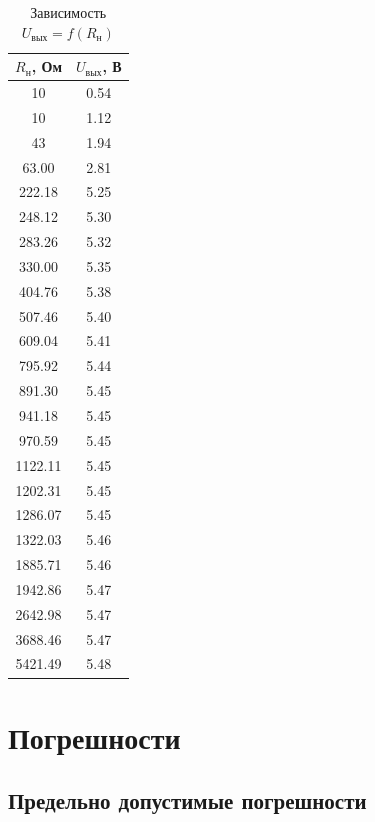 \begin{table}[H]
	\begin{center}
	\caption{Зависимость $U_\text{вых} = f(R_\text{н})$}
	\def\arraystretch{1.2}
		\begin{tabular}{|c|c|}
		\hline 
		$R_\text{н}$, Ом & $U_\text{вых}$, В \\ 
		\hline
		10 & 0.54 \\ 
		\hline 
		10 & 1.12 \\ 
		\hline 
		43 & 1.94 \\ 
		\hline 
		63.00 & 2.81 \\ 
		\hline 
		222.18 & 5.25 \\ 
		\hline 
		248.12 & 5.30 \\ 
		\hline 
		283.26 & 5.32 \\ 
		\hline 
		330.00 & 5.35 \\  
		\hline 
		404.76 & 5.38 \\ 
		\hline 
		507.46 & 5.40 \\ 
		\hline 
		609.04 & 5.41 \\ 
		\hline 
		795.92 & 5.44 \\ 
		\hline 
		891.30 & 5.45 \\ 
		\hline 
		941.18 & 5.45 \\ 
		\hline 
		970.59 & 5.45 \\ 
		\hline 
		1122.11 & 5.45 \\ 
		\hline 
		1202.31 & 5.45 \\ 
		\hline 
		1286.07 & 5.45 \\ 
		\hline 
		1322.03 & 5.46 \\ 
		\hline 
		1885.71 & 5.46 \\ 
		\hline
		1942.86 & 5.47 \\ 
		\hline 
		2642.98 & 5.47 \\ 
		\hline 
		3688.46 & 5.47 \\ 
		\hline 
		5421.49 & 5.48 \\ 
		\hline
		\end{tabular} 
		\label{tab:6:2}
	\end{center}
\end{table}

\section{Погрешности}

\subsection{Предельно допустимые погрешности}

